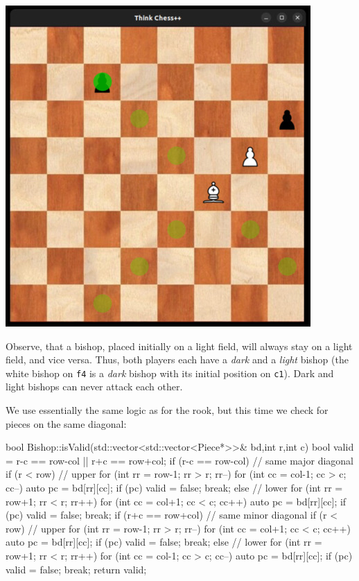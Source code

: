 \begin{center}
\includegraphics[width=.5\linewidth]{../img/bishop}
\end{center}

Observe, that a bishop, placed initially on a light field, will always stay on a light field,
and vice versa.
Thus, both players each have a \emph{dark} and a \emph{light} bishop (the white bishop on
\texttt{f4} is a \emph{dark} bishop with its initial position on \texttt{c1}).
Dark and light bishops can never attack each other.

We use essentially the same logic as for the rook, but this time we check for pieces on
the same diagonal:

\begin{cpp}
bool Bishop::isValid(std::vector<std::vector<Piece*>>& bd,int r,int c) {
  bool valid = r-c == row-col || r+c == row+col;
  if (r-c == row-col) { // same major diagonal
    if (r < row) { // upper
      for (int rr = row-1; rr > r; rr--) {
        for (int cc = col-1; cc > c; cc--) {
          auto pc = bd[rr][cc];
          if (pc) { valid = false; break; }
        }
      }
    } else { // lower
      for (int rr = row+1; rr < r; rr++) {
        for (int cc = col+1; cc < c; cc++) {
          auto pc = bd[rr][cc];
          if (pc) { valid = false; break; }
        }
      }
    }
  }
  if (r+c == row+col) { // same minor diagonal
    if (r < row) { // upper
      for (int rr = row-1; rr > r; rr--) {
        for (int cc = col+1; cc < c; cc++) {
          auto pc = bd[rr][cc];
          if (pc) { valid = false; break; }
        }
      }
    } else { // lower
      for (int rr = row+1; rr < r; rr++) {
        for (int cc = col-1; cc > c; cc--) {
          auto pc = bd[rr][cc];
          if (pc) { valid = false; break; }
        }
      }
    }
  }
  return valid;
}
\end{cpp}

